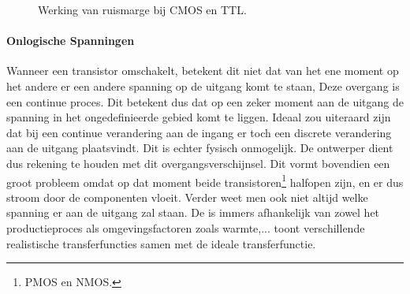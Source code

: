 \begin{figure}[hbt]
\caption{Werking van ruismarge bij CMOS en TTL.}
\end{figure}
\paragraph{Onlogische Spanningen}
Wanneer een transistor omschakelt, betekent dit niet dat van het ene moment op het andere er een andere spanning op de uitgang komt te staan, Deze overgang is een continue proces. Dit betekent dus dat op een zeker moment aan de uitgang de spanning in het ongedefinieerde gebied komt te liggen. Ideaal zou uiteraard zijn dat bij een continue verandering aan de ingang er toch een discrete verandering aan de uitgang plaatsvindt. Dit is echter fysisch onmogelijk. De ontwerper dient dus rekening te houden met dit overgangsverschijnsel. Dit vormt bovendien een groot probleem omdat op dat moment beide transistoren\footnote{PMOS en NMOS.} halfopen zijn, en er dus stroom door de componenten vloeit. Verder weet men ook niet altijd welke spanning er aan de uitgang zal staan. De  is immers afhankelijk van zowel het productieproces als omgevingsfactoren zoals warmte,...  toont verschillende realistische transferfuncties samen met de ideale transferfunctie.
